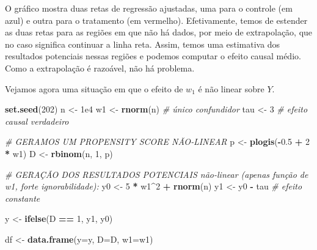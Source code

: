 \documentclass[
]{article}
\newenvironment{Shaded}{\begin{snugshade}}{\end{snugshade}}
\newcommand{\AttributeTok}[1]{\textcolor[rgb]{0.13,0.29,0.53}{#1}}
\newcommand{\CommentTok}[1]{\textcolor[rgb]{0.56,0.35,0.01}{\textit{#1}}}
\newcommand{\DecValTok}[1]{\textcolor[rgb]{0.00,0.00,0.81}{#1}}
\newcommand{\FloatTok}[1]{\textcolor[rgb]{0.00,0.00,0.81}{#1}}
\newcommand{\FunctionTok}[1]{\textcolor[rgb]{0.13,0.29,0.53}{\textbf{#1}}}
\newcommand{\NormalTok}[1]{#1}
\newcommand{\OtherTok}[1]{\textcolor[rgb]{0.56,0.35,0.01}{#1}}
\newcommand{\SpecialCharTok}[1]{\textcolor[rgb]{0.81,0.36,0.00}{\textbf{#1}}}
\begin{document}
O gráfico mostra duas retas de regressão ajustadas, uma para o controle (em azul) e outra para o tratamento (em vermelho). Efetivamente, temos de estender as duas retas para as regiões em que não há dados, por meio de extrapolação, que no caso significa continuar a linha reta. Assim, temos uma estimativa dos resultados potenciais nessas regiões e podemos computar o efeito causal médio. Como a extrapolação é razoável, não há problema.

Vejamos agora uma situação em que o efeito de \(w_1\) é não linear sobre \(Y\).

\begin{Shaded}
\begin{Highlighting}[]
\FunctionTok{set.seed}\NormalTok{(}\DecValTok{202}\NormalTok{)}
\NormalTok{n  }\OtherTok{\textless{}{-}} \FloatTok{1e4}
\NormalTok{w1 }\OtherTok{\textless{}{-}} \FunctionTok{rnorm}\NormalTok{(n)                       }\CommentTok{\# único confundidor}
\NormalTok{tau }\OtherTok{\textless{}{-}} \DecValTok{3}                             \CommentTok{\# efeito causal verdadeiro}

\CommentTok{\# GERAMOS UM PROPENSITY SCORE NÃO‐LINEAR}
\NormalTok{p  }\OtherTok{\textless{}{-}} \FunctionTok{plogis}\NormalTok{(}\SpecialCharTok{{-}}\FloatTok{0.5} \SpecialCharTok{+} \DecValTok{2} \SpecialCharTok{*}\NormalTok{ w1) }
\NormalTok{D  }\OtherTok{\textless{}{-}} \FunctionTok{rbinom}\NormalTok{(n, }\DecValTok{1}\NormalTok{, p)}

\CommentTok{\# GERAÇÃO DOS RESULTADOS POTENCIAIS não{-}linear (apenas função de w1, forte ignorabilidade):}
\NormalTok{y0 }\OtherTok{\textless{}{-}}  \DecValTok{5} \SpecialCharTok{*}\NormalTok{ w1}\SpecialCharTok{\^{}}\DecValTok{2} \SpecialCharTok{+} \FunctionTok{rnorm}\NormalTok{(n)}
\NormalTok{y1 }\OtherTok{\textless{}{-}}\NormalTok{ y0 }\SpecialCharTok{{-}}\NormalTok{ tau                       }\CommentTok{\# efeito constante}

\NormalTok{y  }\OtherTok{\textless{}{-}} \FunctionTok{ifelse}\NormalTok{(D }\SpecialCharTok{==} \DecValTok{1}\NormalTok{, y1, y0)}



\NormalTok{df }\OtherTok{\textless{}{-}} \FunctionTok{data.frame}\NormalTok{(}\AttributeTok{y=}\NormalTok{y, }\AttributeTok{D=}\NormalTok{D, }\AttributeTok{w1=}\NormalTok{w1)}


\end{Highlighting}
\end{Shaded}
\end{document}
